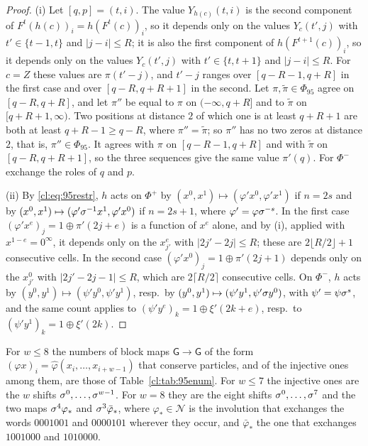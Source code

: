 \begin{proof}
(i) Let $[q,p]=(t,i)$. The value $Y_{h(c)}(t,i)$ is the second component of $F^t(h(c))_i=h(F^t(c))_i$, so it depends only on the values $Y_c(t',j)$ with $t'\in\{t-1,t\}$ and $|j-i|\le R$; it is also the first component of $h(F^{t+1}(c))_i$, so it depends only on the values $Y_c(t',j)$ with $t'\in\{t,t+1\}$ and $|j-i|\le R$. For $c=Z$ these values are $\pi(t'-j)$, and $t'-j$ ranges over $[q-R-1,q+R]$ in the first case and over $[q-R,q+R+1]$ in the second. Let $\pi,\tilde\pi\in\Phi_{95}$ agree on $[q-R,q+R]$, and let $\pi''$ be equal to $\pi$ on $(-\infty,q+R]$ and to $\tilde\pi$ on $[q+R+1,\infty)$. Two positions at distance $2$ of which one is at least $q+R+1$ are both at least $q+R-1\ge q-R$, where $\pi''=\tilde\pi$; so $\pi''$ has no two zeros at distance $2$, that is, $\pi''\in\Phi_{95}$. It agrees with $\pi$ on $[q-R-1,q+R]$ and with $\tilde\pi$ on $[q-R,q+R+1]$, so the three sequences give the same value $\pi'(q)$. For $\Phi^-$ exchange the roles of $q$ and $p$.

(ii) By \eqref{cl:eq:95restr}, $h$ acts on $\Phi^+$ by $(x^0,x^1)\mapsto(\varphi'x^0,\varphi'x^1)$ if $n=2s$ and by $(x^0,x^1)\mapsto(\varphi'\sigma^{-1}x^1,\varphi'x^0)$ if $n=2s+1$, where $\varphi'=\varphi\sigma^{-s}$. In the first case $(\varphi'x^e)_j=1\oplus\pi'(2j+e)$ is a function of $x^e$ alone, and by (i), applied with $x^{1-e}=0^\infty$, it depends only on the $x^e_{j'}$ with $|2j'-2j|\le R$; these are $2\lfloor R/2\rfloor+1$ consecutive cells. In the second case $(\varphi'x^0)_j=1\oplus\pi'(2j+1)$ depends only on the $x^0_{j'}$ with $|2j'-2j-1|\le R$, which are $2\lceil R/2\rceil$ consecutive cells. On $\Phi^-$, $h$ acts by $(y^0,y^1)\mapsto(\psi'y^0,\psi'y^1)$, resp.\ by $(y^0,y^1)\mapsto(\psi'y^1,\psi'\sigma y^0)$, with $\psi'=\psi\sigma^{s}$, and the same count applies to $(\psi'y^e)_k=1\oplus\xi'(2k+e)$, resp.\ to $(\psi'y^1)_k=1\oplus\xi'(2k)$.
\end{proof}

\begin{lemma}\label{cl:lem:95enum}
For $w\le8$ the numbers of block maps $\mathsf G\to\mathsf G$ of the form $(\varphi x)_i=\hat\varphi(x_i,\dots,x_{i+w-1})$ that conserve particles, and of the injective ones among them, are those of Table~\ref{cl:tab:95enum}. For $w\le7$ the injective ones are the $w$ shifts $\sigma^0,\dots,\sigma^{w-1}$. For $w=8$ they are the eight shifts $\sigma^0,\dots,\sigma^7$ and the two maps $\sigma^4\varphi_{\ast}$ and $\sigma^3\bar\varphi_{\ast}$, where $\varphi_{\ast}\in\mathcal N$ is the involution that exchanges the words $0001001$ and $0000101$ wherever they occur, and $\bar\varphi_{\ast}$ the one that exchanges $1001000$ and $1010000$.
\end{lemma}

